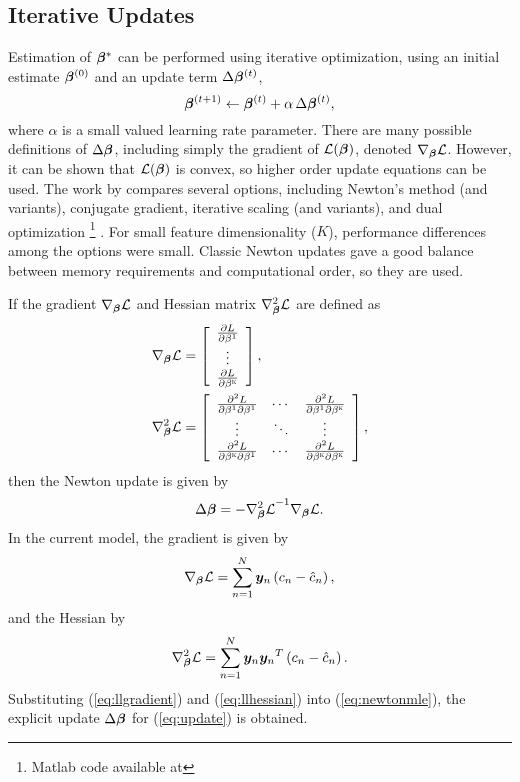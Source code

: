 \subsection{Iterative Updates}
Estimation of $\bm{\beta}^*$ can be performed using iterative optimization, using an initial estimate $\bm{\beta}^{(0)}$ and an update term $\Delta\bm{\beta}^{(t)}$,
\begin{equation}
\bm{\beta}^{(t+1)} \leftarrow \bm{\beta}^{(t)} + \alpha\thinspace\Delta\bm{\beta}^{(t)},
\label{eq:update}
\end{equation}
where $\alpha$ is a small valued learning rate parameter. There are many possible definitions of $\Delta\bm{\beta}$, including simply the gradient of $\mathcal{L}(\bm{\beta})$, denoted $\nabla_{\bm{\beta}}\mathcal{L}$. However, it can be shown that $\mathcal{L}(\bm{\beta})$ is convex, so higher order update equations can be used. The work by \citeauthor{Minka2003} \cite{Minka2003} compares several options, including Newton's method (and variants), conjugate gradient, iterative scaling (and variants), and dual optimization
\footnote{Matlab code available at }
. For small feature dimensionality ($K$), performance differences among the options were small. Classic Newton updates gave a good balance between memory requirements and computational order, so they are used.
\par
If the gradient $\nabla_{\bm{\beta}}\mathcal{L}$ and Hessian matrix $\nabla^2_{\bm{\beta}}\mathcal{L}$ are defined as
\begin{align}
\nabla_{\bm{\beta}}\mathcal{L} &= \left[\begin{array}{c}
\frac{\partial L}{\partial\beta^1}\\\vdots\\\frac{\partial L}{\partial\beta^{\textsc{k}}}
\end{array}\right],\label{eq:llgradient0}\\
\nabla^2_{\bm{\beta}}\mathcal{L} &= \left[\begin{array}{ccc}
\frac{\partial^2 L}{\partial\beta^1\partial\beta^1}&\cdots&\frac{\partial^2 L}{\partial\beta^1\partial\beta^{\textsc{k}}}\\
\vdots&\ddots&\vdots\\
\frac{\partial^2 L}{\partial\beta^{\textsc{k}}\partial\beta^1}&\cdots&\frac{\partial^2 L}{\partial\beta^{\textsc{k}}\partial\beta^{\textsc{k}}}
\end{array}\right]\label{eq:llhessian0},
\end{align}
then the Newton update is given by
\begin{equation}
\Delta\bm{\beta} = -{\nabla^2_{\bm{\beta}}\mathcal{L}}^{-1}\nabla_{\bm{\beta}}\mathcal{L}.
\label{eq:newtonmle}
\end{equation}
In the current model, the gradient is given by 
\begin{equation}
\nabla_{\bm{\beta}}\mathcal{L} = \sum_{n=1}^{N} \bm{y}_n\left(c_n - \hat{c}_n\right),
\label{eq:llgradient}
\end{equation}
and the Hessian by
\begin{equation}
\nabla^2_{\bm{\beta}}\mathcal{L} = \sum_{n=1}^{N} \bm{y}_n{\bm{y}_n}^T \left(c_n - \hat{c}_n\right).
\label{eq:llhessian}
\end{equation}
Substituting (\ref{eq:llgradient}) and (\ref{eq:llhessian}) into (\ref{eq:newtonmle}), the explicit update  $\Delta\bm{\beta}$ for (\ref{eq:update}) is obtained.
